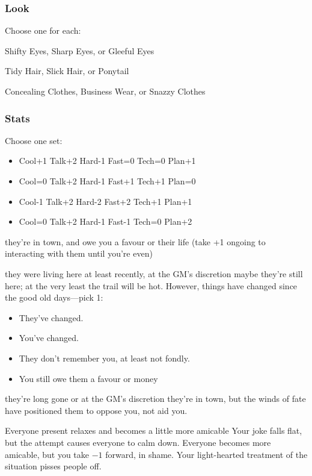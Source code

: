 \subsubsection{Look}
Choose one for each:

Shifty Eyes, Sharp Eyes, or Gleeful Eyes

Tidy Hair, Slick Hair, or Ponytail

Concealing Clothes, Business Wear, or Snazzy Clothes

\subsubsection{Stats}
Choose one set:
\begin{itemize}
\setlength\itemsep{0em}
\item Cool+1 Talk+2 Hard-1 Fast=0 Tech=0 Plan+1
\item Cool=0 Talk+2 Hard-1 Fast+1 Tech+1 Plan=0
\item Cool-1 Talk+2 Hard-2 Fast+2 Tech+1 Plan+1
\item Cool=0 Talk+2 Hard-1 Fast-1 Tech=0 Plan+2
\end{itemize}

{they're in town, and owe you a favour or their life (take +1 ongoing to interacting with them until you're even)}
{they were living here at least recently, at the GM's discretion maybe they're still here; at the very least the trail will be hot. However, things have changed since the good old days---pick 1:
\begin{itemize}
\item They've changed.
\item You've changed.
\item They don't remember you, at least not fondly.
\item You still owe them a favour or money
\end{itemize}}
{they're long gone or at the GM's discretion they're in town, but the winds of fate have positioned them to oppose you, not aid you.}

{Everyone present relaxes and becomes a little more amicable}
{Your joke falls flat, but the attempt causes everyone to calm down. Everyone becomes more amicable, but you take $-1$ forward, in shame.}
{Your light-hearted treatment of the situation pisses people off.}

